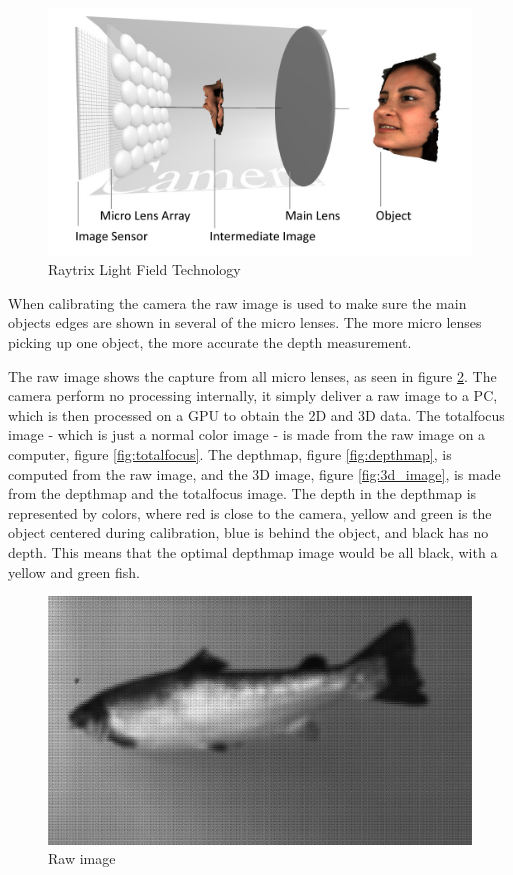 \begin{figure}[h]
    \centering
    \includegraphics[width=.9\linewidth]{images/introduction/Light-Field-Camera-Schematic}
    \caption{Raytrix Light Field Technology}
    \label{fig:light_field}
\end{figure}

When calibrating the camera the raw image is used to make sure the main objects edges are shown in several of the micro lenses. The more micro lenses picking up one object, the more accurate the depth measurement. 

The raw image shows the capture from all micro lenses, as seen in figure \ref{fig:raw_image}. The camera perform no processing internally, it simply deliver a raw image to a PC, which is then processed on a GPU to obtain the 2D and 3D data. 
The totalfocus image - which is just a normal color image - is made from the raw image on a computer, figure \ref{fig:totalfocus}. 
The depthmap, figure \ref{fig:depthmap}, is computed from the raw image, and the 3D image, figure \ref{fig:3d_image}, is made from the depthmap and the totalfocus image. 
The depth in the depthmap is represented by colors, where red is close to the camera, yellow and green is the object centered during calibration, blue is behind the object, and black has no depth. This means that the optimal depthmap image would be all black, with a yellow and green fish.

\begin{figure}[h]
    \centering
    \includegraphics[width=.9\linewidth]{images/introduction/raw}
    \caption{Raw image}
    \label{fig:raw_image}
\end{figure}

